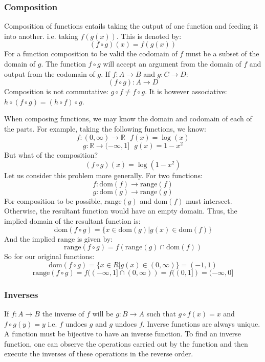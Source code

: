 \documentclass[12pt]{report}
\newcommand{\R}{\mathbb{R}}
\begin{document}
\begin{flushleft}
\subsubsection*{Composition}
Composition of functions entails taking the output of one function and feeding
it into another. i.e. taking \(f(g(x))\). This is denoted by:
\[(f \circ g)(x) = f(g(x))\]
For a function composition to be valid the codomain of \(f\) must be a subset 
of the domain of \(g\). The function \(f \circ g\) will accept an argument 
from the domain of \(f\) and output from the codomain of \(g\). 
If \(f: A \rightarrow B\) and \(g: C \rightarrow D\):
\[(f \circ g): A \rightarrow D\]
Composition is not commutative: \(g \circ f \neq f \circ g\). It is however
associative: \(h \circ (f \circ g) = (h \circ f) \circ g\).

\bigskip
When composing functions, we may know the domain and codomain of each of the
parts. For example, taking the following functions, we know:
\[f: (0, \infty) \rightarrow \R \:\:\: f(x) = \log(x)\]
\[g: \R \rightarrow (-\infty, 1] \:\:\: g(x) = 1 - x^2\]
But what of the composition?
\[(f \circ g)(x) = \log(1 - x^2)\]
Let us consider this problem more generally. For two functions:
\[f: \mathrm{dom}(f) \rightarrow \mathrm{range}(f)\]
\[g: \mathrm{dom}(g) \rightarrow \mathrm{range}(g)\]
For composition to be possible, \(\mathrm{range}(g)\) and \(\mathrm{dom}(f)\) 
must intersect. Otherwise, the resultant function would have an empty domain. 
Thus, the implied domain of the resultant function is:
\[\mathrm{dom}(f \circ g) = \{x \in \mathrm{dom}(g) 
| g(x) \in \mathrm{dom}(f)\}\]
And the implied range is given by:
\[\mathrm{range}(f \circ g) = f(\mathrm{range}(g) \cap \mathrm{dom}(f))\]
So for our original functions:
\[\mathrm{dom}(f \circ g) = \{x \in R | g(x) \in (0, \infty)\} = (-1, 1)\]
\[\mathrm{range}(f \circ g) = f((-\infty, 1] \cap (0, \infty)) = f((0, 1]) 
= (-\infty, 0]\]

\subsubsection*{Inverses}
If \(f: A \rightarrow B\) the inverse of \(f\) will be \(g: B \rightarrow A\)
such that \(g \circ f(x) = x\) and \(f \circ g(y) = y\) i.e. \(f\) undoes \(g\)
and \(g\) undoes \(f\). Inverse functions are always unique. A function must be
bijective to have an inverse function. To find an inverse function, one can 
observe the operations carried out by the function and then execute the 
inverses of these operations in the reverse order.


\end{flushleft}
\end{document}
